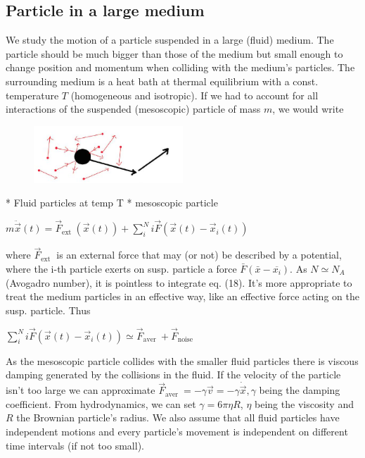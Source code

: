 \subsection*{Particle in a large medium}
We study the motion of a particle suspended in a large (fluid) medium. The
particle should be much bigger than those of the medium but small enough to
change position and momentum when colliding with the medium's particles. The
surrounding medium is a heat bath at thermal equilibrium with a const.
temperature $T$ (homogeneous and isotropic).
If we had to account for all interactions of the suspended (mesoscopic) particle
of mass $m$, we would write
\begin{figure}[H]
  \centering
  \includegraphics[width=0.5\textwidth]{graphics/2025_10_17_15d569b79a40ed74679eg-10}
\end{figure}
    * Fluid particles at temp T
    * mesoscopic particle
\begin{DispWithArrows}[displaystyle, format=c]
  $m \ddot{\vec{x}}(t)=\vec{F}_{\text {ext }}(\vec{x}(t))+\sum_{i}^{N} i \vec{F}\left(\vec{x}(t)-\vec{x}_{i}(t)\right)$
\end{DispWithArrows}
where $\vec{F}_{\text {ext }}$ is an external force that may (or not) be
described by a potential, where the i-th particle exerts on susp. particle a
force $\bar{F}\left(\bar{x}-\overline{x_{i}}\right)$. As $N \simeq N_{A}$ (Avogadro number), it is pointless to integrate eq. (18). It's more appropriate
to treat the medium particles in an effective way, like an effective force
acting on the susp. particle. Thus
\begin{DispWithArrows}[displaystyle, format=c]
  $\sum_{i}^{N} i \vec{F}\left(\vec{x}(t)-\vec{x}_{i}(t)\right) \simeq \vec{F}_{\text {aver }}+\vec{F}_{\text {noise }}$
\end{DispWithArrows}
As the mesoscopic particle collides with the smaller fluid particles there is
viscous damping generated by the collisions in the fluid. If the velocity of the
particle isn't too large we can approximate
$\vec{F}_{\text {aver }}=-\gamma \vec{v}=-\gamma \dot{\vec{x}}, \gamma$ being the
damping coefficient. From hydrodynamics, we can set $\gamma=6 \pi \eta R$,
$\eta$ being the viscosity and $R$ the Brownian particle's radius.
We also assume that all fluid particles have independent motions and every
particle's movement is independent on different time intervals (if not too
small).

